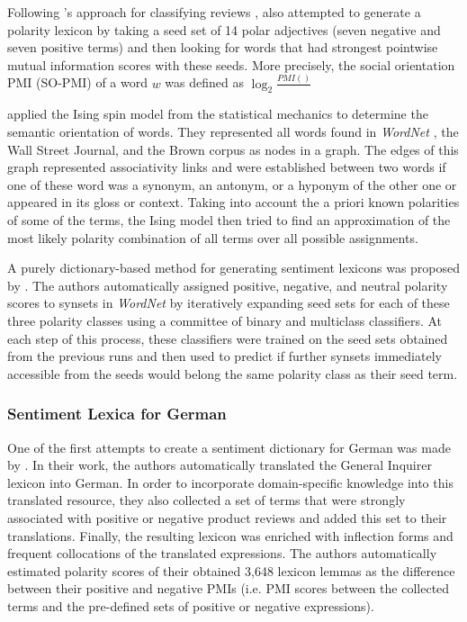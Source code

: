 Following \citeauthor{Turney:02}'s approach for classifying reviews
\citep{Turney:02}, \citet{Turney:03} also attempted to generate a
polarity lexicon by taking a seed set of 14 polar adjectives (seven
negative and seven positive terms) and then looking for words that had
strongest pointwise mutual information scores with these seeds. More
precisely, the social orientation PMI (SO-PMI) of a word $w$ was
defined as $\log_2\frac{PMI()}{}$

\citet{Takamura:05} applied the Ising spin model from the statistical
mechanics to determine the semantic orientation of words.  They
represented all words found in \emph{WordNet} \cite{Miller:95}, the
Wall Street Journal, and the Brown corpus as nodes in a graph.  The
edges of this graph represented associativity links and were
established between two words if one of these word was a synonym, an
antonym, or a hyponym of the other one or appeared in its gloss or
context.  Taking into account the a priori known polarities of some of
the terms, the Ising model then tried to find an approximation of the
most likely polarity combination of all terms over all possible
assignments.


A purely dictionary-based method for generating sentiment lexicons was
proposed by \citet{Esuli:06b}.  The authors automatically assigned
positive, negative, and neutral polarity scores to synsets in
\emph{WordNet} by iteratively expanding seed sets for each of these
three polarity classes using a committee of binary and multiclass
classifiers.  At each step of this process, these classifiers were
trained on the seed sets obtained from the previous runs and then used
to predict if further synsets immediately accessible from the seeds
would belong the same polarity class as their seed term.

\subsubsection{Sentiment Lexica for German}

One of the first attempts to create a sentiment dictionary for German
was made by \citet{Remus:10}.  In their work, the authors
automatically translated the General Inquirer lexicon \cite{Stone:66}
into German.  In order to incorporate domain-specific knowledge into
this translated resource, they also collected a set of terms that were
strongly associated with positive or negative product reviews and
added this set to their translations.  Finally, the resulting lexicon
was enriched with inflection forms and frequent collocations of the
translated expressions.  The authors automatically estimated polarity
scores of their obtained 3,648 lexicon lemmas as the difference
between their positive and negative PMIs (i.e. PMI scores between the
collected terms and the pre-defined sets of positive or negative
expressions).

